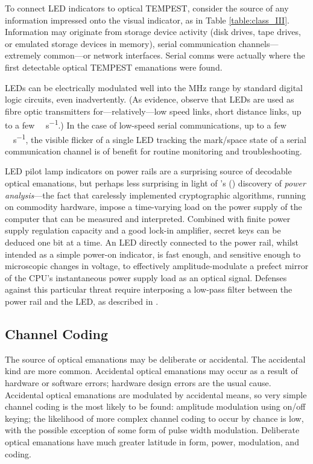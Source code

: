 \documentclass[a4paper,twoside,11pt]{book}
\begin{document}
To connect LED indicators to optical TEMPEST, consider the source of any
information impressed onto the visual indicator, as in Table
\ref{table:class_III}. Information may originate from storage device activity
(disk drives, tape drives, or emulated storage devices in memory), serial
communication channels---extremely common---or network interfaces. Serial comms
were actually where the first detectable optical TEMPEST emanations were found.

LEDs can be electrically modulated well into the \si{\mega\hertz} range by
standard digital logic circuits, even inadvertently. (As evidence, observe that
LEDs are used as fibre optic transmitters for---relatively---low speed links,
short distance links, up to a few \si{\mega\bit\per\second}.) In the case of
low-speed serial communications, up to a few \si{\kilo\bit\per\second}, the
visible flicker of a single LED tracking the mark/space state of a serial
communication channel is of benefit for routine monitoring and troubleshooting.

LED pilot lamp indicators on power rails are a surprising source of decodable
optical emanations, but perhaps less surprising in light of
\citeauthor{Kocher1999}'s (\citeyear{Kocher1999}) discovery of \emph{power
analysis}---the fact that carelessly implemented cryptographic algorithms,
running on commodity hardware, impose a time-varying load on the power supply
of the computer that can be measured and interpreted. Combined with finite
power supply regulation capacity and a good lock-in amplifier, secret keys can
be deduced one bit at a time. An LED directly connected to the power rail,
whilst intended as a simple power-on indicator, is fast enough, and sensitive
enough to microscopic changes in voltage, to effectively amplitude-modulate a
prefect mirror of the CPU's instantaneous power supply load as an optical
signal. Defenses against this particular threat require interposing a low-pass
filter between the power rail and the LED, as described in \cite{Loughry2006a}.

\subsection{Channel Coding}

The source of optical emanations may be deliberate or accidental. The
accidental kind are more common. Accidental optical emanations may occur as a
result of hardware or software errors; hardware design errors are the usual
cause. Accidental optical emanations are modulated by accidental means, so very
simple channel coding is the most likely to be found: amplitude modulation
using on/off keying; the likelihood of more complex channel coding to occur by
chance is low, with the possible exception of some form of pulse width
modulation. Deliberate optical emanations have much greater latitude in form,
power, modulation, and coding.
\end{document}

